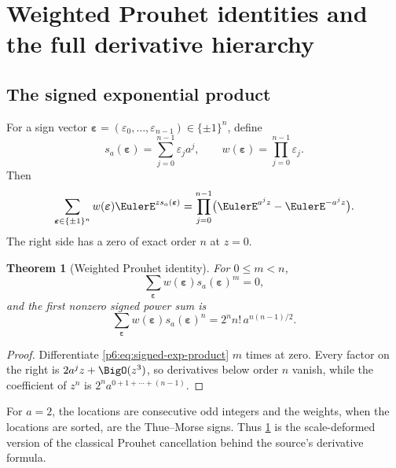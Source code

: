 \documentclass[11pt,oneside]{article}
\numberwithin{equation}{section}
\newtheorem{theorem}{Theorem}[section]
\theoremstyle{definition}
\theoremstyle{remark}
\begin{document}
\section{Weighted Prouhet identities and the full derivative hierarchy}

\subsection{The signed exponential product}

For a sign vector $\boldsymbol\varepsilon=(\varepsilon_0,\ldots,
\varepsilon_{n-1})\in\{\pm1\}^n$, define
\begin{equation}\label{p6:eq:sign-location}
 s_a(\boldsymbol\varepsilon)
 =\sum_{j=0}^{n-1}\varepsilon_j a^j,
 \qquad
 w(\boldsymbol\varepsilon)=\prod_{j=0}^{n-1}\varepsilon_j.
\end{equation}
Then
\begin{equation}\label{p6:eq:signed-exp-product}
 \sum_{\boldsymbol\varepsilon\in\{\pm1\}^n}
 w(\boldsymbol\varepsilon)
 \EulerE^{z s_a(\boldsymbol\varepsilon)}
 =\prod_{j=0}^{n-1}
 \bigl(\EulerE^{a^jz}-\EulerE^{-a^jz}\bigr).
\end{equation}
The right side has a zero of exact order $n$ at $z=0$.

\begin{theorem}[Weighted Prouhet identity]\label{p6:thm:weighted-prouhet}
For $0\le m<n$,
\begin{equation}\label{p6:eq:prouhet-vanish}
 \sum_{\boldsymbol\varepsilon}
 w(\boldsymbol\varepsilon)s_a(\boldsymbol\varepsilon)^m=0,
\end{equation}
and the first nonzero signed power sum is
\begin{equation}\label{p6:eq:prouhet-leading}
 \sum_{\boldsymbol\varepsilon}
 w(\boldsymbol\varepsilon)s_a(\boldsymbol\varepsilon)^n
 =2^n n!\,a^{n(n-1)/2}.
\end{equation}
\end{theorem}

\begin{proof}
Differentiate \eqref{p6:eq:signed-exp-product} $m$ times at zero.  Every factor on
the right is $2a^jz+\BigO(z^3)$, so derivatives below order $n$ vanish, while
the coefficient of $z^n$ is
$2^na^{0+1+\cdots+(n-1)}$.
\end{proof}

For $a=2$, the locations are consecutive odd integers and the weights, when the
locations are sorted, are the Thue--Morse signs.  Thus
\cref{p6:thm:weighted-prouhet} is the scale-deformed version of the classical
Prouhet cancellation behind the source's derivative formula.
\end{document}

